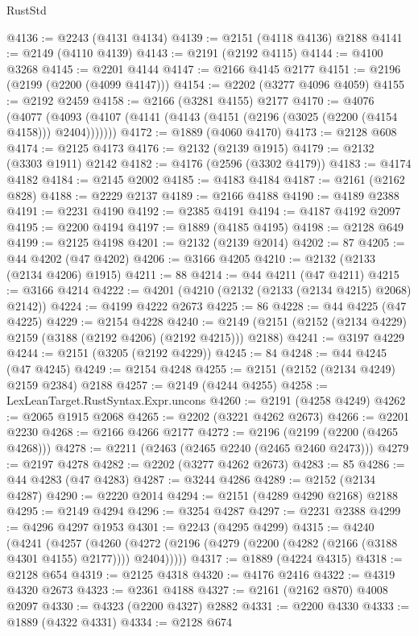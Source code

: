 \begin{lexlean}{RustStd}
\begin{coremodule}
@4136 := @2243 (@4131 @4134)
@4139 := @2151 (@4118 @4136) @2188
@4141 := @2149 (@4110 @4139)
@4143 := @2191 (@2192 @4115)
@4144 := @4100 @3268
@4145 := @2201 @4144
@4147 := @2166 @4145 @2177
@4151 := @2196 (@2199 (@2200 (@4099 @4147)))
@4154 := @2202 (@3277 @4096 @4059)
@4155 := @2192 @2459
@4158 := @2166 (@3281 @4155) @2177
@4170 := @4076
    (@4077 (@4093 (@4107 (@4141 (@4143 (@4151 (@2196 (@3025 (@2200 (@4154 @4158))) @2404)))))))
@4172 := @1889 (@4060 @4170)
@4173 := @2128 @608
@4174 := @2125 @4173
@4176 := @2132 (@2139 @1915)
@4179 := @2132 (@3303 @1911) @2142
@4182 := @4176 (@2596 (@3302 @4179))
@4183 := @4174 @4182
@4184 := @2145 @2002
@4185 := @4183 @4184
@4187 := @2161 (@2162 @828)
@4188 := @2229 @2137
@4189 := @2166 @4188
@4190 := @4189 @2388
@4191 := @2231 @4190
@4192 := @2385 @4191
@4194 := @4187 @4192 @2097
@4195 := @2200 @4194
@4197 := @1889 (@4185 @4195)
@4198 := @2128 @649
@4199 := @2125 @4198
@4201 := @2132 (@2139 @2014)
@4202 := 87
@4205 := @44 @4202 (@47 @4202)
@4206 := @3166 @4205
@4210 := @2132 (@2133 (@2134 @4206) @1915)
@4211 := 88
@4214 := @44 @4211 (@47 @4211)
@4215 := @3166 @4214
@4222 := @4201 (@4210 (@2132 (@2133 (@2134 @4215) @2068) @2142))
@4224 := @4199 @4222 @2673
@4225 := 86
@4228 := @44 @4225 (@47 @4225)
@4229 := @2154 @4228
@4240 := @2149 (@2151 (@2152 (@2134 @4229) @2159 (@3188 (@2192 @4206) (@2192 @4215))) @2188)
@4241 := @3197 @4229
@4244 := @2151 (@3205 (@2192 @4229))
@4245 := 84
@4248 := @44 @4245 (@47 @4245)
@4249 := @2154 @4248
@4255 := @2151 (@2152 (@2134 @4249) @2159 @2384) @2188
@4257 := @2149 (@4244 @4255)
@4258 := LexLeanTarget.RustSyntax.Expr.uncons
@4260 := @2191 (@4258 @4249)
@4262 := @2065 @1915 @2068
@4265 := @2202 (@3221 @4262 @2673)
@4266 := @2201 @2230
@4268 := @2166 @4266 @2177
@4272 := @2196 (@2199 (@2200 (@4265 @4268)))
@4278 := @2211 (@2463 (@2465 @2240 (@2465 @2460 @2473)))
@4279 := @2197 @4278
@4282 := @2202 (@3277 @4262 @2673)
@4283 := 85
@4286 := @44 @4283 (@47 @4283)
@4287 := @3244 @4286
@4289 := @2152 (@2134 @4287)
@4290 := @2220 @2014
@4294 := @2151 (@4289 @4290 @2168) @2188
@4295 := @2149 @4294
@4296 := @3254 @4287
@4297 := @2231 @2388
@4299 := @4296 @4297 @1953
@4301 := @2243 (@4295 @4299)
@4315 := @4240
    (@4241
      (@4257
        (@4260 (@4272 (@2196 (@4279 (@2200 (@4282 (@2166 (@3188 @4301 @4155) @2177)))) @2404)))))
@4317 := @1889 (@4224 @4315)
@4318 := @2128 @654
@4319 := @2125 @4318
@4320 := @4176 @2416
@4322 := @4319 @4320 @2673
@4323 := @2361 @4188
@4327 := @2161 (@2162 @870) @4008 @2097
@4330 := @4323 (@2200 @4327) @2882
@4331 := @2200 @4330
@4333 := @1889 (@4322 @4331)
@4334 := @2128 @674

\end{coremodule}
\end{lexlean}
